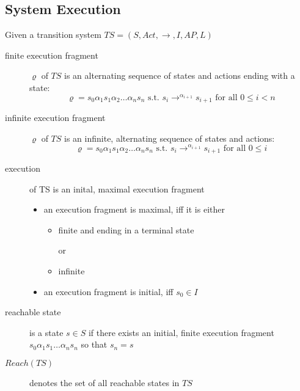 \documentclass[a4paper, 10pt]{article}
\begin{document}
\subsection*{System Execution}
Given a transition system $TS=\left(S,Act,\to,I,AP,L\right)$
\begin{description}
    \item[finite execution fragment] $\varrho$ of $TS$ is an alternating sequence of states and actions ending with a state:
    \[ \varrho = s_0\alpha_1 s_1\alpha_2\dots\alpha_n s_n \textrm{ s.t. } s_i\to^{\alpha_{i+1}} s_{i+1} \textrm{ for all } 0\leq i<n \]
    \item[infinite execution fragment] $\varrho$ of $TS$ is an infinite, alternating sequence of states and actions:
    \[ \varrho = s_0\alpha_1 s_1\alpha_2\dots\alpha_n s_n \textrm{ s.t. } s_i\to^{\alpha_{i+1}} s_{i+1} \textrm{ for all } 0\leq i \]
    \item[execution] of TS is an inital, maximal execution fragment
    \begin{itemize}
        \item an execution fragment is maximal, iff it is either
        \begin{itemize}
            \item finite and ending in a terminal state
            \item[or]
            \item infinite
        \end{itemize}
        \item an execution fragment is initial, iff $s_0\in I$
    \end{itemize}
    \item[reachable state] is a state $s\in S$ if there exists an initial, finite execution fragment $s_0\alpha_1s_1\dots\alpha_ns_n$ so that $s_n=s$
    \item[$Reach(TS)$] denotes the set of all reachable states in $TS$ \\
    \scalebox{1}{}
\end{description}
\end{document}
